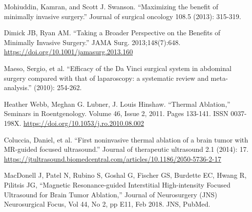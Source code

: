 \documentclass[12pt]{report}
\begin{document}
\singlespacing
\cleardoublepage

%
%
%
\begin{thebibliography}{99}

 Mohiuddin, Kamran, and Scott J. Swanson. ``Maximizing the benefit of minimally invasive surgery.'' Journal of surgical oncology 108.5 (2013): 315-319.

 Dimick JB, Ryan AM. ``Taking a Broader Perspective on the Benefits of Minimally Invasive Surgery.'' JAMA Surg. 2013;148(7):648. \url{https://doi.org/10.1001/jamasurg.2013.160}

 Maeso, Sergio, et al. ``Efficacy of the Da Vinci surgical system in abdominal surgery compared with that of laparoscopy: a systematic review and meta-analysis.'' (2010): 254-262.

 Heather Webb, Meghan G. Lubner, J. Louis Hinshaw. ``Thermal Ablation,'' Seminars in Roentgenology. Volume 46, Issue 2, 2011. Pages 133-141. ISSN 0037-198X. \url{https://doi.org/10.1053/j.ro.2010.08.002}

 Coluccia, Daniel, et al. ``First noninvasive thermal ablation of a brain tumor with MR-guided focused ultrasound.'' Journal of therapeutic ultrasound 2.1 (2014): 17. \url{https://jtultrasound.biomedcentral.com/articles/10.1186/2050-5736-2-17}

 MacDonell J, Patel N, Rubino S, Goshal G, Fischer GS, Burdette EC, Hwang R, Pilitsis JG, ``Magnetic Resonance-guided Interstitial High-intensity Focused Ultrasound for Brain Tumor Ablation,'' Journal of Neurosurgery (JNS) Neurosurgical Focus, Vol 44, No 2, pp E11, Feb 2018. JNS, PubMed.


\end{thebibliography}
\end{document}
